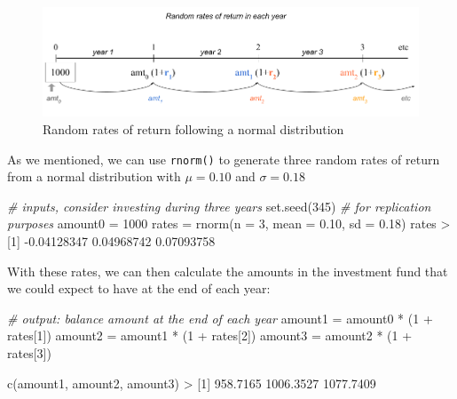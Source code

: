 \documentclass[
]{book}
\newenvironment{Shaded}{\begin{snugshade}}{\end{snugshade}}
\newcommand{\AttributeTok}[1]{\textcolor[rgb]{0.77,0.63,0.00}{#1}}
\newcommand{\CommentTok}[1]{\textcolor[rgb]{0.56,0.35,0.01}{\textit{#1}}}
\newcommand{\DecValTok}[1]{\textcolor[rgb]{0.00,0.00,0.81}{#1}}
\newcommand{\FloatTok}[1]{\textcolor[rgb]{0.00,0.00,0.81}{#1}}
\newcommand{\FunctionTok}[1]{\textcolor[rgb]{0.00,0.00,0.00}{#1}}
\newcommand{\NormalTok}[1]{#1}
\newcommand{\OtherTok}[1]{\textcolor[rgb]{0.56,0.35,0.01}{#1}}
\newcommand{\SpecialCharTok}[1]{\textcolor[rgb]{0.00,0.00,0.00}{#1}}
\begin{document}
\begin{figure}

{\centering \includegraphics[width=0.95\linewidth]{images/iterations/timeline-investment-stock-market2} 

}

\caption{Random rates of return following a normal distribution}\label{fig:unnamed-chunk-288}
\end{figure}

As we mentioned, we can use \texttt{rnorm()} to generate three random rates of return
from a normal distribution with \(\mu = 0.10\) and \(\sigma = 0.18\)

\begin{Shaded}
\begin{Highlighting}[]
\CommentTok{\# inputs, consider investing during three years}
\FunctionTok{set.seed}\NormalTok{(}\DecValTok{345}\NormalTok{)   }\CommentTok{\# for replication purposes}
\NormalTok{amount0 }\OtherTok{=} \DecValTok{1000}
\NormalTok{rates }\OtherTok{=} \FunctionTok{rnorm}\NormalTok{(}\AttributeTok{n =} \DecValTok{3}\NormalTok{, }\AttributeTok{mean =} \FloatTok{0.10}\NormalTok{, }\AttributeTok{sd =} \FloatTok{0.18}\NormalTok{)}
\NormalTok{rates}
\SpecialCharTok{\textgreater{}}\NormalTok{ [}\DecValTok{1}\NormalTok{] }\SpecialCharTok{{-}}\FloatTok{0.04128347}  \FloatTok{0.04968742}  \FloatTok{0.07093758}
\end{Highlighting}
\end{Shaded}

With these rates, we can then calculate the amounts in the investment fund that
we could expect to have at the end of each year:

\begin{Shaded}
\begin{Highlighting}[]
\CommentTok{\# output: balance amount at the end of each year}
\NormalTok{amount1 }\OtherTok{=}\NormalTok{ amount0 }\SpecialCharTok{*}\NormalTok{ (}\DecValTok{1} \SpecialCharTok{+}\NormalTok{ rates[}\DecValTok{1}\NormalTok{])}
\NormalTok{amount2 }\OtherTok{=}\NormalTok{ amount1 }\SpecialCharTok{*}\NormalTok{ (}\DecValTok{1} \SpecialCharTok{+}\NormalTok{ rates[}\DecValTok{2}\NormalTok{])}
\NormalTok{amount3 }\OtherTok{=}\NormalTok{ amount2 }\SpecialCharTok{*}\NormalTok{ (}\DecValTok{1} \SpecialCharTok{+}\NormalTok{ rates[}\DecValTok{3}\NormalTok{])}

\FunctionTok{c}\NormalTok{(amount1, amount2, amount3)}
\SpecialCharTok{\textgreater{}}\NormalTok{ [}\DecValTok{1}\NormalTok{]  }\FloatTok{958.7165} \FloatTok{1006.3527} \FloatTok{1077.7409}
\end{Highlighting}
\end{Shaded}
\end{document}

